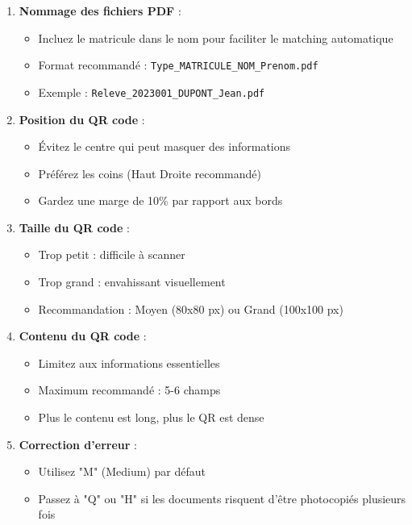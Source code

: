 \begin{enumerate}[leftmargin=*]
    \item \textbf{Nommage des fichiers PDF} :
    \begin{itemize}
        \item Incluez le matricule dans le nom pour faciliter le matching automatique
        \item Format recommandé : \texttt{Type\_MATRICULE\_NOM\_Prenom.pdf}
        \item Exemple : \texttt{Releve\_2023001\_DUPONT\_Jean.pdf}
    \end{itemize}

    \item \textbf{Position du QR code} :
    \begin{itemize}
        \item Évitez le centre qui peut masquer des informations
        \item Préférez les coins (Haut Droite recommandé)
        \item Gardez une marge de 10\% par rapport aux bords
    \end{itemize}

    \item \textbf{Taille du QR code} :
    \begin{itemize}
        \item Trop petit : difficile à scanner
        \item Trop grand : envahissant visuellement
        \item Recommandation : Moyen (80x80 px) ou Grand (100x100 px)
    \end{itemize}

    \item \textbf{Contenu du QR code} :
    \begin{itemize}
        \item Limitez aux informations essentielles
        \item Maximum recommandé : 5-6 champs
        \item Plus le contenu est long, plus le QR est dense
    \end{itemize}

    \item \textbf{Correction d'erreur} :
    \begin{itemize}
        \item Utilisez "M" (Medium) par défaut
        \item Passez à "Q" ou "H" si les documents risquent d'être photocopiés plusieurs fois
    \end{itemize}
\end{enumerate}

\newpage
